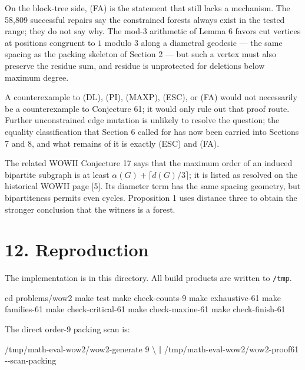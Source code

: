 \documentclass[
  11pt,
  letterpaper,
]{article}
\newenvironment{Shaded}{}{}
\newcommand{\AttributeTok}[1]{\textcolor[rgb]{0.49,0.56,0.16}{#1}}
\newcommand{\BuiltInTok}[1]{\textcolor[rgb]{0.00,0.50,0.00}{#1}}
\newcommand{\DataTypeTok}[1]{\textcolor[rgb]{0.56,0.13,0.00}{#1}}
\newcommand{\ExtensionTok}[1]{#1}
\newcommand{\FunctionTok}[1]{\textcolor[rgb]{0.02,0.16,0.49}{#1}}
\newcommand{\KeywordTok}[1]{\textcolor[rgb]{0.00,0.44,0.13}{\textbf{#1}}}
\newcommand{\NormalTok}[1]{#1}
\begin{document}
On the block-tree side, (FA) is the statement that still lacks a
mechanism. The 58,809 successful repairs say the constrained forests
always exist in the tested range; they do not say why. The mod-\(3\)
arithmetic of Lemma 6 favors cut vertices at positions congruent to
\(1\) modulo \(3\) along a diametral geodesic --- the same spacing as
the packing skeleton of Section 2 --- but such a vertex must also
preserve the residue sum, and residue is unprotected for deletions below
maximum degree.

A counterexample to (DL), (PI), (MAXP), (ESC), or (FA) would not
necessarily be a counterexample to Conjecture 61; it would only rule out
that proof route. Further unconstrained edge mutation is unlikely to
resolve the question; the equality classification that Section 6 called
for has now been carried into Sections 7 and 8, and what remains of it
is exactly (ESC) and (FA).

The related WOWII Conjecture 17 says that the maximum order of an
induced bipartite subgraph is at least
\(\alpha(G)+\lceil d(G)/3\rceil\); it is listed as resolved on the
historical WOWII page {[}5{]}. Its diameter term has the same spacing
geometry, but bipartiteness permits even cycles. Proposition 1 uses
distance three to obtain the stronger conclusion that the witness is a
forest.

\section{12. Reproduction}\label{reproduction}

The implementation is in this directory. All build products are written
to \texttt{/tmp}.

\begin{Shaded}
\begin{Highlighting}[]
\BuiltInTok{cd}\NormalTok{ problems/wow2}
\FunctionTok{make}\NormalTok{ test}
\FunctionTok{make}\NormalTok{ check{-}counts{-}9}
\FunctionTok{make}\NormalTok{ exhaustive{-}61}
\FunctionTok{make}\NormalTok{ families{-}61}
\FunctionTok{make}\NormalTok{ check{-}critical{-}61}
\FunctionTok{make}\NormalTok{ check{-}maxine{-}61}
\FunctionTok{make}\NormalTok{ check{-}finish{-}61}
\end{Highlighting}
\end{Shaded}

The direct order-\(9\) packing scan is:

\begin{Shaded}
\begin{Highlighting}[]
\ExtensionTok{/tmp/math{-}eval{-}wow2/wow2{-}generate}\NormalTok{ 9 }\DataTypeTok{\textbackslash{}}
  \KeywordTok{|} \ExtensionTok{/tmp/math{-}eval{-}wow2/wow2{-}proof61} \AttributeTok{{-}{-}scan{-}packing}
\end{Highlighting}
\end{Shaded}
\end{document}
